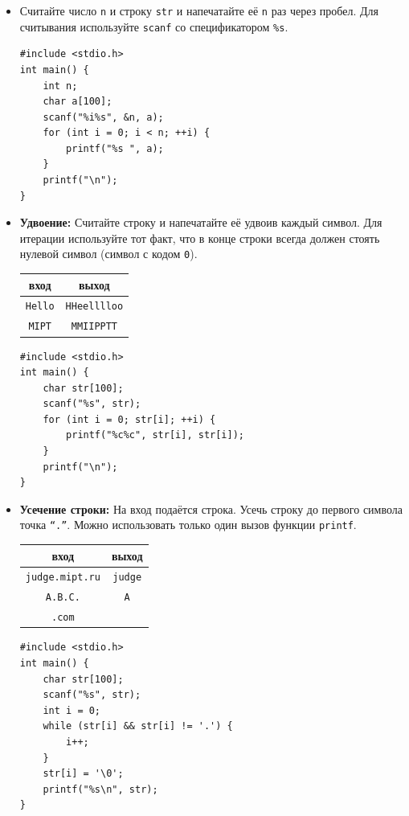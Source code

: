 \documentclass{article}
\begin{document}
\begin{itemize}
\newpage
\item Считайте число \texttt{n} и строку \texttt{str} и напечатайте её \texttt{n} раз через пробел. Для считывания используйте \texttt{scanf} со спецификатором \texttt{\%s}.
\begin{lstlisting}[backgroundcolor = \color{solcolor}]
#include <stdio.h>
int main() {
    int n;
    char a[100];
    scanf("%i%s", &n, a);
    for (int i = 0; i < n; ++i) {
        printf("%s ", a);
    }
    printf("\n");
}
\end{lstlisting}

\item \textbf{Удвоение:} Считайте строку и напечатайте её удвоив каждый символ. Для итерации используйте тот факт, что в конце строки всегда должен стоять нулевой символ (символ с кодом \texttt{0}).
\begin{center}
\begin{tabular}{ c | c }
 вход & выход \\ \hline
 \texttt{Hello} & \texttt{HHeelllloo}  \\ 
 \texttt{MIPT} & \texttt{MMIIPPTT}  \\ 
\end{tabular}
\end{center}

\begin{lstlisting}[backgroundcolor = \color{solcolor}]
#include <stdio.h>
int main() {
    char str[100];
    scanf("%s", str);
    for (int i = 0; str[i]; ++i) {
        printf("%c%c", str[i], str[i]);
    }
    printf("\n");
}
\end{lstlisting}

\item \textbf{Усечение строки:} На вход подаётся строка. Усечь строку до первого символа точка \texttt{``.''}. Можно использовать только один вызов функции \texttt{printf}.
\begin{center}
\begin{tabular}{ c | c }
 вход & выход \\ \hline
 \texttt{judge.mipt.ru} & \texttt{judge} \\
 \texttt{A.B.C.} & \texttt{A}  \\ 
 \texttt{.com}   &   \\ 
\end{tabular}
\end{center}

\begin{lstlisting}[backgroundcolor = \color{solcolor}]
#include <stdio.h>
int main() {
    char str[100];
    scanf("%s", str);
    int i = 0;
    while (str[i] && str[i] != '.') {
        i++;
    }
    str[i] = '\0';
    printf("%s\n", str);
}
\end{lstlisting}


\end{itemize}
\end{document}

